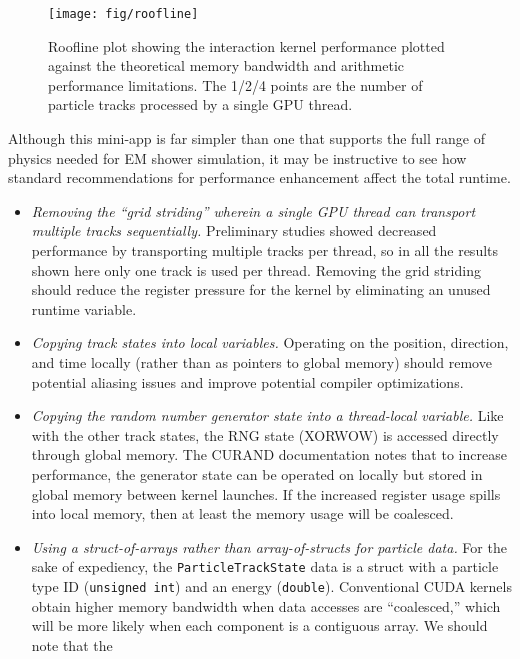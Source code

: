 \documentclass{webofc}
\begin{document}
\begin{figure}[htb]
  \centering
  \texttt{[image: fig/roofline]}
  \caption{Roofline plot showing the interaction kernel performance
    plotted against the theoretical memory bandwidth and arithmetic performance
    limitations. The 1/2/4 points are the number of particle tracks processed by
    a single GPU thread.}
  \label{fig:roofline}
\end{figure}

\clearpage

Although this mini-app is far simpler than one that supports the full range of
physics needed for EM shower simulation, it may be instructive to see how
standard recommendations for performance enhancement affect the total runtime.

\begin{itemize}
  \item \emph{Removing the ``grid striding'' wherein a single GPU thread can
    transport multiple tracks sequentially.} Preliminary studies showed
    decreased performance by transporting multiple tracks per thread, so in all
    the results shown here only one track is used per thread. Removing the grid
    striding should reduce the register pressure for the kernel by eliminating
    an unused runtime variable.
  \item \emph{Copying track states into local variables.} Operating on the
    position, direction, and time locally (rather than as pointers to global
    memory) should remove potential aliasing issues and improve potential
    compiler optimizations.
  \item \emph{Copying the random number generator state into a thread-local
    variable.}
    Like with the other track states, the RNG state (XORWOW) is accessed
    directly through global memory. The CURAND documentation notes
    that to increase performance, the generator state can be operated on locally
    but stored in global memory between kernel launches. If the increased
    register usage spills into local memory, then at least the memory usage will
    be coalesced.
  \item \emph{Using a struct-of-arrays rather than array-of-structs for particle
    data.} For the sake of expediency, the \texttt{ParticleTrackState} data is a
    struct with a particle type ID (\texttt{unsigned int}) and an energy
    (\texttt{double}). Conventional CUDA kernels obtain higher memory
    bandwidth when data accesses are ``coalesced,'' which will be more likely
    when each component is a contiguous array. We should note that the

\end{itemize}
\end{document}
